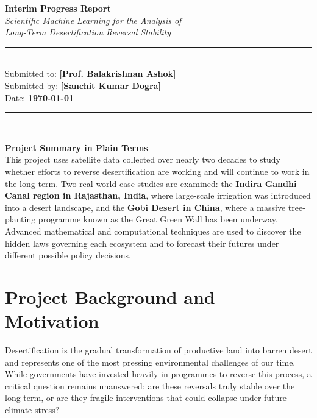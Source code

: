 \documentclass[12pt, a4paper]{article}
\begin{document}
\begin{titlepage}
    \centering
    \vspace*{2cm}
    {\LARGE \textbf{Interim Progress Report}}\\[0.6cm]
    {\large \textit{Scientific Machine Learning for the Analysis of}}\\[0.2cm]
    {\large \textit{Long-Term Desertification Reversal Stability}}\\[1.8cm]
    \rule{\textwidth}{1pt}\\[0.6cm]
    {\large Submitted to: \textbf{[Prof. Balakrishnan Ashok]}}\\[0.3cm]
    {\large Submitted by: \textbf{[Sanchit Kumar Dogra]}}\\[0.3cm]
    {\large Date: \textbf{\today}}\\[0.6cm]
    \rule{\textwidth}{1pt}\\[1.5cm]
    \begin{mdframed}[style=keybox]
        \textbf{Project Summary in Plain Terms}\\[6pt]
        This project uses satellite data collected over nearly two decades to
        study whether efforts to reverse desertification are working and will
        continue to work in the long term. Two real-world case studies are
        examined: the \textbf{Indira Gandhi Canal region in Rajasthan, India},
        where large-scale irrigation was introduced into a desert landscape,
        and the \textbf{Gobi Desert in China}, where a massive tree-planting
        programme known as the Great Green Wall has been underway.
        Advanced mathematical and computational techniques are used to
        discover the hidden laws governing each ecosystem and to forecast
        their futures under different possible policy decisions.
    \end{mdframed}
    \vfill
\end{titlepage}

\tableofcontents
\newpage

\section{Project Background and Motivation}

Desertification is the gradual transformation of productive land into barren
desert and represents one of the most pressing environmental challenges of
our time. While governments have invested heavily in programmes to reverse
this process, a critical question remains unanswered: are these reversals
truly stable over the long term, or are they fragile interventions that could
collapse under future climate stress?
\end{document}
